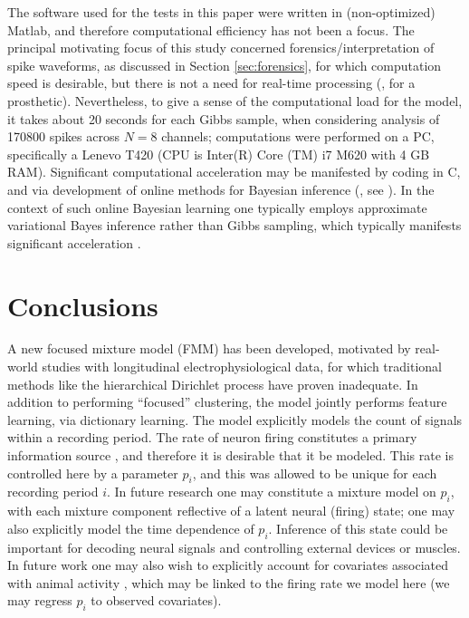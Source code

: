 \documentclass[journal]{IEEEtran}
\begin{document}
The software used for the tests in this paper were written in (non-optimized) Matlab, and therefore computational efficiency has not been a focus. The principal motivating focus of this study concerned forensics/interpretation of spike waveforms, as discussed in Section \ref{sec:forensics}, for which computation speed is desirable, but there is not a need for real-time processing (, for a prosthetic).
 Nevertheless, to give a sense of the computational load for the model, it takes about 20 seconds for each Gibbs sample, when considering analysis of 170800 spikes across $N=8$ channels; computations were performed on a PC, specifically a Lenevo T420 (CPU is Inter(R) Core (TM) i7 M620 with 4 GB RAM). Significant computational acceleration may be manifested by coding in C, and via development of online methods for Bayesian inference (, see \cite{Wang11}). In the context of such online Bayesian learning one typically employs approximate variational Bayes inference rather than Gibbs sampling, which typically manifests significant acceleration \cite{Wang11}.

\section{Conclusions\label{sec:conclusions}}

A new focused mixture model (FMM) has been developed, motivated by real-world studies with longitudinal electrophysiological data, for which traditional methods like the hierarchical Dirichlet process have proven inadequate. In addition to performing ``focused'' clustering, the model jointly performs feature learning, via dictionary learning. The model explicitly models the count of signals within a recording period. The rate of neuron firing constitutes a primary information source \cite{Donoghue07}, and therefore it is desirable that it be modeled. This rate is controlled here by a parameter $p_i$, and this was allowed to be unique for each recording period $i$. In future research one may constitute a mixture model on $p_i$, with each mixture component reflective of a latent neural (firing) state; one may also explicitly model the time dependence of $p_i$. Inference of this state could be important for decoding neural signals and controlling external devices or muscles. In future work one may also wish to explicitly account for covariates associated with animal activity \cite{Ventura}, which may be linked to the firing rate we model here (we may regress $p_i$ to observed covariates).
\end{document}
